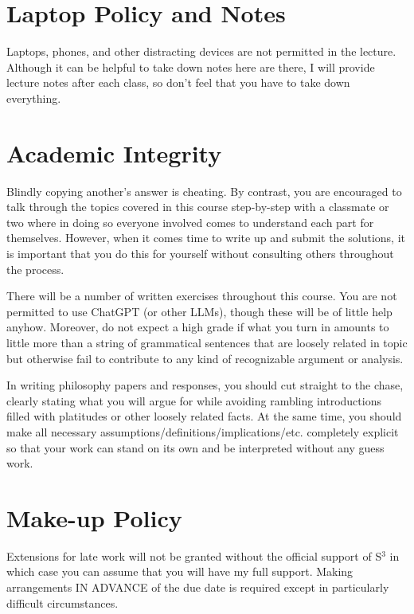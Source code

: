\documentclass[letterpaper]{infinity_syllabus} %
\begin{document}
\vspace{0.5cm}
\section{Laptop Policy and Notes}

Laptops, phones, and other distracting devices are not permitted in the lecture.
Although it can be helpful to take down notes here are there, I will provide lecture notes after each class, so don't feel that you have to take down everything.

\vspace{0.5cm}
\section{Academic Integrity}

Blindly copying another's answer is cheating.
By contrast, you are encouraged to talk through the topics covered in this course step-by-step with a classmate or two where in doing so everyone involved comes to understand each part for themselves.
However, when it comes time to write up and submit the solutions, it is important that you do this for yourself without consulting others throughout the process.

There will be a number of written exercises throughout this course.
You are not permitted to use ChatGPT (or other LLMs), though these will be of little help anyhow.
Moreover, do not expect a high grade if what you turn in amounts to little more than a string of grammatical sentences that are loosely related in topic but otherwise fail to contribute to any kind of recognizable argument or analysis.

In writing philosophy papers and responses, you should cut straight to the chase, clearly stating what you will argue for while avoiding rambling introductions filled with platitudes or other loosely related facts.
At the same time, you should make all necessary assumptions/definitions/implications/etc. completely explicit so that your work can stand on its own and be interpreted without any guess work.

\vspace{0.5cm}
\section{Make-up Policy}

Extensions for late work will not be granted without the official support of S$^3$ in which case you can assume that you will have my full support.
Making arrangements IN ADVANCE of the due date is required except in particularly difficult circumstances.
\end{document}
